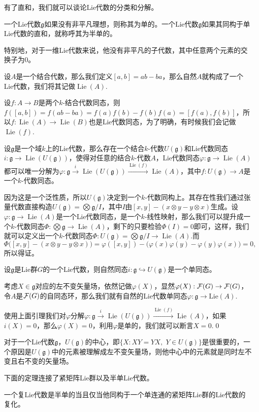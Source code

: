 \documentclass[10pt]{article}
\newcommand{\lag}{{\mathfrak{g}}}
\DeclareMathOperator{\lie}{Lie}
\begin{document}
有了直和，我们就可以谈论Lie代数的分类和分解。

\para 一个Lie代数$\lag$如果没有非平凡理想，则称其为单的。一个Lie代数$\lag$如果其同构于单Lie代数的直和，就称呼其为半单的。

特别地，对于一维Lie代数来说，他没有非平凡的子代数，其中任意两个元素的交换子为0。

\para 设$A$是一个结合代数，那么我们定义$[a,b]=ab-ba$，那么自然$A$就构成了一个Lie代数，我们将其记做$\lie(A)$.

设$f:A\to B$是两个$k$-结合代数同态，则$f([a,b])=f(ab-ba)=f(a)f(b)-f(b)f(a)=[f(a),f(b)]$，所以$f:\lie(A)\to \lie(B)$也是Lie代数同态，为了明确，有时候我们会记做$\lie(f)$. 

\lem 设$\lag$是一个域$k$上的Lie代数，那么存在一个结合$k$-代数$U(\lag)$和Lie代数同态$i:\lag\to \lie(U(\lag))$，使得对任意的结合$k$-代数$A$，Lie代数同态$\varphi:\lag\to \lie(A)$都可以唯一分解为$\varphi:\lag \xrightarrow{i} \lie(U(\lag))\xrightarrow{\lie(f)}\lie(A)$，其中$f:U(\lag)\to A$是一个$k$-代数同态。

因为这是一个泛性质，所以$U(\lag)$决定到一个$k$-代数同构上。其存在性我们通过张量代数直接构造$U(\lag)=\bigotimes \lag/I$，其中$I$由$[x,y]-(x\otimes y-y\otimes x)$生成。设$\varphi:\lag\to \lie(A)$是一个Lie代数同态，是一个$k$-线性映射，那么我们可以提升成一个$k$-代数同态$\Phi:\bigotimes\lag\to \lie(A)$，剩下的只要检验$\Phi(I)=0$即可，这样，我们就可以定义出一个$k$-代数同态$\Phi:U(\lag)=\bigotimes \lag/I\to \lie(A)$.而
\[
	\Phi\bigl([x,y]-(x\otimes y-y\otimes x)\bigr)=\varphi([x,y])-\bigl(\varphi(x)\varphi(y)-\varphi(y)\varphi(x)\bigr)=0,
\]
所以得证。

\para 设$\lag$是Lie群$G$的一个Lie代数，则自然同态$i:\lag\hookrightarrow U(\lag)$是一个单同态。

\proof 考虑$X\in \lag$对应的左不变矢量场，依然记做$\varphi(X)$，显然$\varphi(X):\mathcal{F}(G)\to \mathcal{F}(G)$，令$A$是$\mathcal{F}(G)$的自同态环，那么我们就有自然的Lie代数单同态$\varphi:\lag \to \mathrm{Lie}(A)$.

使用上面引理我们对$\varphi$分解$\varphi:\lag \xrightarrow{i} \lie(U(\lag))\xrightarrow{\lie(f)}\lie(A)$，如果$i(X)=0$，那么$\varphi(X)=0$，利用$\varphi$是单的，我们就可以断言$X=0$.\qed

\para 对于一个Lie代数$\lag$，$U(\lag)$的中心，即$\{X:XY=YX,$ $Y\in U(\lag)\}$是很重要的，一个原因是$U(\lag)$中的元素被理解成左不变矢量场，则他中心中的元素就是同时左不变且右不变的矢量场。

下面的定理连接了紧矩阵Lie群以及半单Lie代数。

\theo 一个复Lie代数是半单的当且仅当他同构于一个单连通的紧矩阵Lie群的Lie代数的复化。
\end{document}
